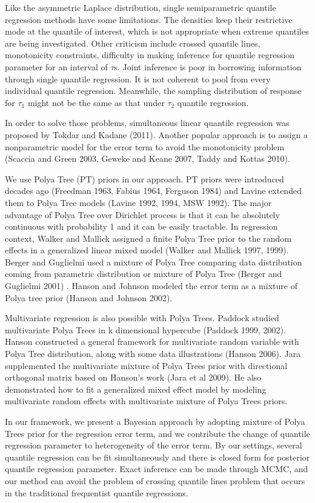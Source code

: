 \documentclass[12pt]{article}
\begin{document}
Like the asymmetric Laplace distribution, single semiparametric
quantile regression  methods
have some limitations. The densities keep their restrictive mode at
the quantile of interest, which is not appropriate when extreme
quantiles are being investigated. Other criticism include crossed
quantile lines, monotonicity constraints, difficulty in making
inference for quantile regression parameter for an interval of
$\tau$s. Joint inference is poor in borrowing information through
single quantile regression. It is not coherent to pool from every
individual quantile regression. Meanwhile, the sampling distribution
of response for $\tau_1$ might not be the same as that under $\tau_2$
quantile regression.

In order to solve those problems, simultaneous linear quantile
regression was proposed by Tokdar and Kadane (2011). 
Another popular approach is to assign a nonparametric model for the
error term to avoid the monotonicity problem (Scaccia and Green 2003,
Geweke and Keane 2007, Taddy and Kottas 2010).

We use Polya Tree (PT) priors in our approach. PT priors were introduced
decades ago (Freedman 1963, Fabius 1964, Ferguson 1984) and  Lavine
extended them to Polya Tree models (Lavine 1992, 1994, MSW 1992). The
major advantage of 
Polya Tree over Dirichlet process is that it can be absolutely
continuous with probability 1 and it can be easily tractable. In
regression context, Walker and Mallick assigned a finite Polya Tree
prior to the random effects in a generalized linear mixed model
(Walker and Mallick 1997, 1999). Berger and Guglielmi used a mixture
of Polya Tree comparing data distribution coming from parametric
distribution or mixture of Polya Tree (Berger and Guglielmi 2001)
. Hanson and Johnson modeled the error term as a mixture of Polya tree
prior (Hanson and Johnson 2002). 

Multivariate regression is also possible with Polya Trees. Paddock
studied multivariate Polya Trees in k dimensional hypercube (Paddock 1999,
2002). Hanson constructed a general framework for multivariate random
variable with Polya Tree distribution, along with some data
illustrations (Hanson 2006). Jara supplemented the multivariate
mixture of Polya Trees prior with directional orthogonal matrix based
on Hanson's work (Jara et al 2009). He also demonstrated how to fit a
generalized mixed effect model by modeling multivariate random effects
with multivariate mixture of Polya Trees priors. 

In our framework, we present a Bayesian approach by adopting mixture
of Polya Trees prior for the regression error term, and we contribute
the change of quantile regression parameter to heterogeneity of the
error term. By our settings, several quantile regression can be fit
simultaneously and there is closed form for  posterior quantile
regression parameter. Exact inference can be made through MCMC, and
our method can avoid the problem of 
crossing quantile lines problem that occurs in the
traditional frequentist quantile regressions. 
\end{document}
